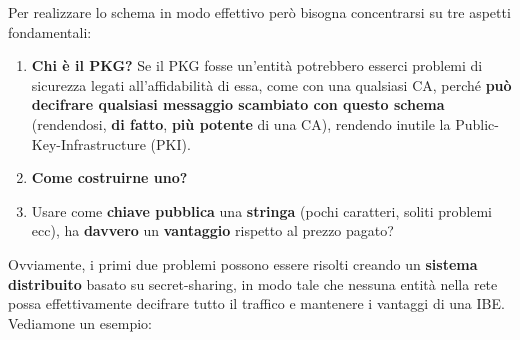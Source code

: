 Per realizzare lo schema in modo effettivo però bisogna concentrarsi su tre aspetti fondamentali:
\begin{enumerate}
    \item \textbf{Chi è il PKG?} Se il PKG fosse un'entità potrebbero esserci problemi di sicurezza legati all'affidabilità di essa, come con una qualsiasi CA, perché \textbf{può decifrare qualsiasi messaggio scambiato con questo schema} (rendendosi, \textbf{di fatto}, \textbf{più potente} di una CA), rendendo inutile la Public-Key-Infrastructure (PKI).
    \item \textbf{Come costruirne uno?} 
    \item Usare come \textbf{chiave pubblica} una \textbf{stringa} (pochi caratteri, soliti problemi ecc), ha \textbf{davvero} un \textbf{vantaggio} rispetto al prezzo pagato?
\end{enumerate}
Ovviamente, i primi due problemi possono essere risolti creando un \textbf{sistema distribuito} basato su secret-sharing, in modo tale che nessuna entità nella rete possa effettivamente decifrare tutto il traffico e mantenere i vantaggi di una IBE. Vediamone un esempio:

